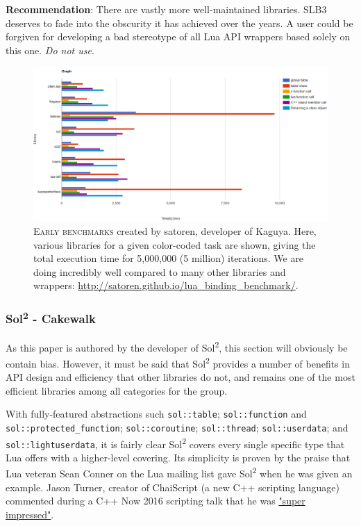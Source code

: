 \documentclass[conference,compsoc]{IEEEtran}
\newcommand{\soltwo}{Sol\textsuperscript{2}}
\begin{document}
\textbf{Recommendation}: There are vastly more well-maintained libraries. SLB3 deserves to fade into the obscurity it has achieved over the years. A user could be forgiven for developing a bad stereotype of all Lua API wrappers based solely on this one. \emph{Do not use}.

\begin{figure}[ht!]
	\includegraphics[width=\textwidth]{early-benchmark}
	\centering
	\caption{\textsc{Early benchmarks} created by satoren, developer of Kaguya. Here, various libraries for a given color-coded task are shown, giving the total execution time for 5,000,000 (5 million) iterations. We are doing incredibly well compared to many other libraries and wrappers: \url{http://satoren.github.io/lua_binding_benchmark/}.}
	\label{fig:early-benchmark}
\end{figure}

\subsubsection{\soltwo{} - Cakewalk}

As this paper is authored by the developer of \soltwo{}, this section will obviously be contain bias. However, it must be said that \soltwo{} provides a number of benefits in API design and efficiency that other libraries do not, and remains one of the most efficient libraries among all categories for the group. 

With fully-featured abstractions such \lstinline|sol::table|; \lstinline|sol::function| and \lstinline|sol::protected_function|; \lstinline|sol::coroutine|; \lstinline|sol::thread|; \lstinline|sol::userdata|; and \lstinline|sol::lightuserdata|, it is fairly clear \soltwo{} covers every single specific type that Lua offers with a higher-level covering. Its simplicity is proven by the praise that Lua veteran Sean Conner on the Lua mailing list gave \soltwo{} when he was given an example\cite{conman-impressed}. Jason Turner, creator of ChaiScript\cite{chaiscript} (a new C++ scripting language) commented during a C++ Now 2016 scripting talk that he was \href{http://chat.stackoverflow.com/transcript/message/30509197\#30509197}{"super impressed"}.\\
\end{document}
